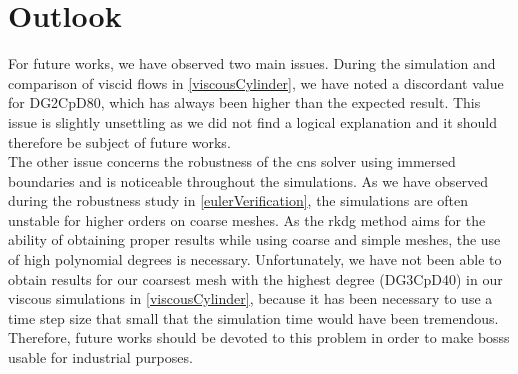 \newpage
\section{Outlook}
For future works, we have observed two main issues. During the simulation and comparison of viscid flows in \cref{viscousCylinder}, we have noted a discordant value for DG2CpD80, which has always been higher than the expected result. This issue is slightly unsettling as we did not find a logical explanation and it should therefore be subject of future works. \\\indent
The other issue concerns the robustness of the \gls{cns} solver using immersed boundaries and is noticeable throughout the simulations. As we have observed during the robustness study in \cref{eulerVerification}, the simulations are often unstable for higher orders on coarse meshes. As the \gls{rkdg} method aims for the ability of obtaining proper results while using coarse and simple meshes, the use of high polynomial degrees is necessary. Unfortunately, we have not been able to obtain results for our coarsest mesh with the highest degree (DG3CpD40) in our viscous simulations in \cref{viscousCylinder}, because it has been necessary to use a time step size that small that the simulation time would have been tremendous. Therefore, future works should be devoted to this problem in order to make \gls{bosss} usable for industrial purposes. 

